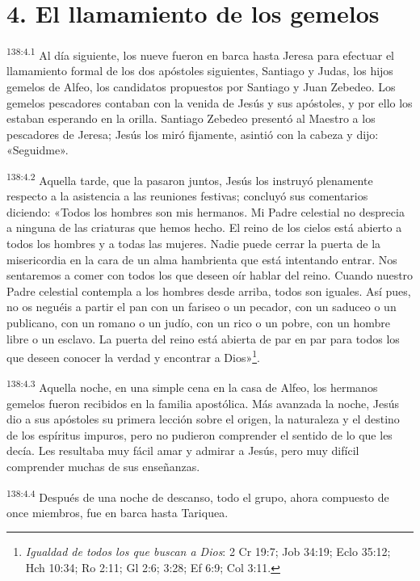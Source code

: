 \section*{4. El llamamiento de los gemelos}
\par 
\textsuperscript{138:4.1} Al día siguiente, los nueve fueron en barca hasta Jeresa para efectuar el llamamiento formal de los dos apóstoles siguientes, Santiago y Judas, los hijos gemelos de Alfeo, los candidatos propuestos por Santiago y Juan Zebedeo. Los gemelos pescadores contaban con la venida de Jesús y sus apóstoles, y por ello los estaban esperando en la orilla. Santiago Zebedeo presentó al Maestro a los pescadores de Jeresa; Jesús los miró fijamente, asintió con la cabeza y dijo: «Seguidme».

\par 
\textsuperscript{138:4.2} Aquella tarde, que la pasaron juntos, Jesús los instruyó plenamente respecto a la asistencia a las reuniones festivas; concluyó sus comentarios diciendo: «Todos los hombres son mis hermanos. Mi Padre celestial no desprecia a ninguna de las criaturas que hemos hecho. El reino de los cielos está abierto a todos los hombres y a todas las mujeres. Nadie puede cerrar la puerta de la misericordia en la cara de un alma hambrienta que está intentando entrar. Nos sentaremos a comer con todos los que deseen oír hablar del reino. Cuando nuestro Padre celestial contempla a los hombres desde arriba, todos son iguales. Así pues, no os neguéis a partir el pan con un fariseo o un pecador, con un saduceo o un publicano, con un romano o un judío, con un rico o un pobre, con un hombre libre o un esclavo. La puerta del reino está abierta de par en par para todos los que deseen conocer la verdad y encontrar a Dios»\footnote{\textit{Igualdad de todos los que buscan a Dios}: 2 Cr 19:7; Job 34:19; Eclo 35:12; Hch 10:34; Ro 2:11; Gl 2:6; 3:28; Ef 6:9; Col 3:11.}.

\par 
\textsuperscript{138:4.3} Aquella noche, en una simple cena en la casa de Alfeo, los hermanos gemelos fueron recibidos en la familia apostólica. Más avanzada la noche, Jesús dio a sus apóstoles su primera lección sobre el origen, la naturaleza y el destino de los espíritus impuros, pero no pudieron comprender el sentido de lo que les decía. Les resultaba muy fácil amar y admirar a Jesús, pero muy difícil comprender muchas de sus enseñanzas.

\par 
\textsuperscript{138:4.4} Después de una noche de descanso, todo el grupo, ahora compuesto de once miembros, fue en barca hasta Tariquea.

